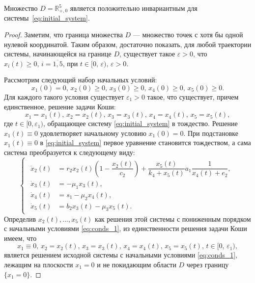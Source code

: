 \documentclass[14pt,a4paper]{extarticle}
\begin{document}
	\begin{theorem}
		Множество $D=\mathbb{R}^5_{+,0}$ является положительно инвариантным для системы~\ref{eq:initial_system}.
	\end{theorem}
	\begin{proof}
		Заметим, что граница множества $D$ --- множество точек с хотя бы одной нулевой координатой. Таким образом, достаточно показать, для любой траектории системы, начинающейся на границе $D$, существует такое $\varepsilon>0$, что $x_i(t)\ge0,\, i=\overline{1,5}$, при $t\in[0,\,\varepsilon),\,\varepsilon>0$.
		
		Рассмотрим следующий набор начальных условий:
		\begin{equation}\label{eq:conds_1}
			x_1(0)=0,\, x_2(0)\ge0,\, x_3(0)\ge0,\, x_4(0)\ge0,\, x_5(0)\ge0.
		\end{equation}
		Для каждого такого условия существует $\varepsilon_1>0$ такое, что существует, причем единственное, решение задачи Коши: 
		\begin{equation*}
			x_1=x_1(t),\, x_2=x_2(t),\, x_3=x_3(t),\, x_4=x_4(t),\, x_5=x_5(t),
		\end{equation*}
		где $t\in[0,\varepsilon_1)$, обращающее систему \ref{eq:initial_system} в тождество. Решение $x_1(t)\equiv0$ удовлетворяет начальному условию $x_1(0)=0$. При подстановке $x_1(t)\equiv0$ в \ref{eq:initial_system} первое уравнение становится тождеством, а сама система преобразуется к следующему виду:
		\begin{equation*}
			\begin{cases}
				\begin{aligned}
					\dot{x}_2(t) &= r_2x_2(t)\left(1-\dfrac{x_2(t)}{c_2}\right)+\dfrac{x_5(t)}{k_4+x_5(t)}a_1\dfrac{1}{x_4(t)+e_2},\\
					\dot{x}_3(t) &= -\mu_1x_3(t),\\
					\dot{x}_4(t) &= s_1 - \mu_2x_4(t),\\
					\dot{x}_5(t) &= b_2x_3(t)-\mu_3x_5(t).
				\end{aligned}
			\end{cases}
		\end{equation*} 
		Определив $x_2(t),\ldots,x_5(t)$ как решения этой системы с пониженным порядком с начальными условиями \ref{eq:conds_1}, из единственности решения задачи Коши имеем, что
		\begin{equation*}
		x_1\equiv0,\, x_2=x_2(t),\, x_3=x_3(t),\, x_4=x_4(t),\, x_5=x_5(t),\, t\in[0,\,\varepsilon_1),
		\end{equation*}
		является решением исходной системы с начальными условиями \ref{eq:conds_1}, лежащим на плоскости $x_1=0$ и не покидающим области $D$ через границу $\{x_1=0\}$.
		

\end{proof}
\end{document}
